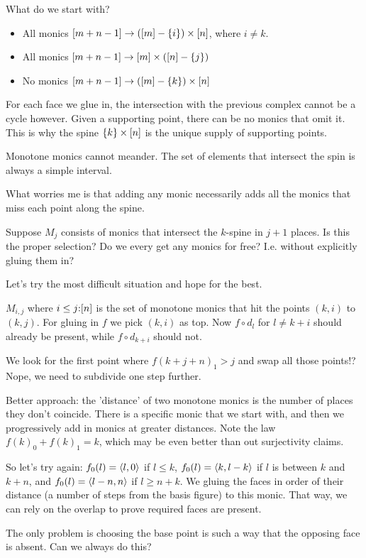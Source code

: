 \documentclass[csh.tex]{subfiles}
\begin{document}
What do we start with?
\begin{itemize}
\item All monics $[m+n-1] \to ([m]-\left\{i\right\})\times[n]$, where $i\neq k$.
\item All monics $[m+n-1] \to [m]\times ([n]-\left\{j\right\})$
\item No monics $[m+n-1] \to ([m]-\left\{k\right\})\times[n]$
\end{itemize}
For each face we glue in, the intersection with the previous complex cannot be a cycle however.
Given a supporting point, there can be no monics that omit it.
This is why the spine $\left\{k\right\}\times[n]$ is the unique supply of supporting points.

Monotone monics cannot meander. The set of elements that intersect the spin is always a simple interval.

What worries me is that adding any monic necessarily adds all the monics that miss each point along the spine.

Suppose $M_j$ consists of monics that intersect the $k$-spine in $j+1$ places. Is this the proper selection?
Do we every get any monics for free? I.e. without explicitly gluing them in?

Let's try the most difficult situation and hope for the best.

$M_{i,j}$ where $i\leq j\mathord :[n]$ is the set of monotone monics that hit the points $(k,i)$ to $(k,j)$.
For gluing in $f$ we pick $(k,i)$ as top. Now $f\circ d_l$ for $l\neq k+i$ should already be present, while
$f\circ d_{k+i}$ should not.

We look for the first point where $f(k+j+n)_1 > j$ and swap all those points!?
Nope, we need to subdivide one step further.

Better approach: the 'distance' of two monotone monics is the number of places they don't coincide.
There is a specific monic that we start with, and then we progressively add in monics at greater distances.
Note the law $f(k)_0+f(k)_1=k$, which may be even better than out surjectivity claims.

So let's try again: $f_0(l) = \left\langle l,0 \right\rangle$ if $l\leq k$, $f_0(l) = \left\langle k,l-k \right\rangle$ if $l$ is between $k$ and $k+n$, and 
$f_0(l) = \left\langle l-n,n \right\rangle$ if $l\geq n+k$. We gluing the faces in order of their distance (a number of steps from the basis figure)
to this monic. That way, we can rely on the overlap to prove required faces are present.

The only problem is choosing the base point is such a way that the opposing face is absent. Can we always do this?
\end{document}
